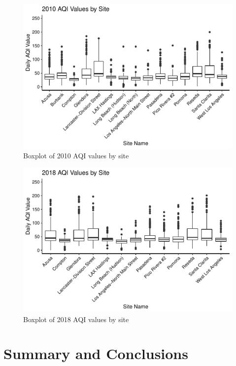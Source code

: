 \documentclass[12pt,]{article}
\begin{document}
\begin{figure}
\centering
\includegraphics{Roth_ENV872_Project_files/figure-latex/box plot 4-1.pdf}
\caption{Boxplot of 2010 AQI values by site}
\end{figure}

\begin{figure}
\centering
\includegraphics{Roth_ENV872_Project_files/figure-latex/box plot 5-1.pdf}
\caption{Boxplot of 2018 AQI values by site}
\end{figure}

\newpage

\section{Summary and Conclusions}\label{summary-and-conclusions}
\end{document}
